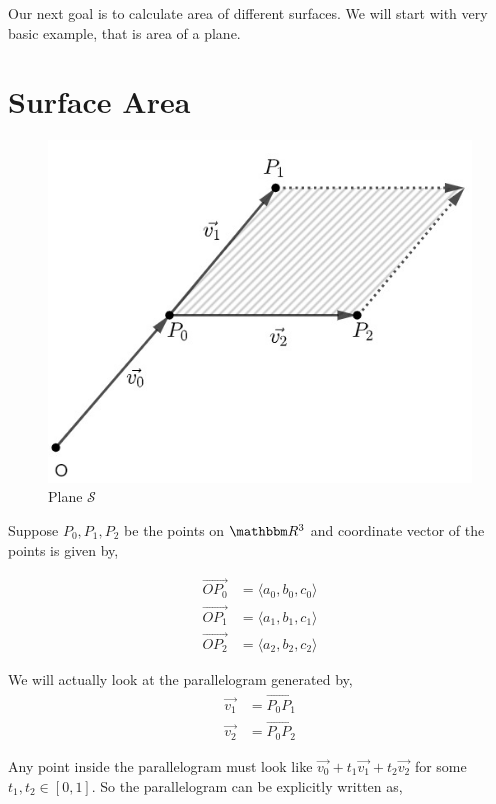 \documentclass[../Analysis-3]{subfiles}
\begin{document}
Our next goal is to calculate area of different surfaces. We will start with very basic example, that is area of a plane.

\vfill

\pagebreak

\section{Surface Area} \label{marker}

\begin{figure}
    \centering
    \includegraphics[width=.78\linewidth]{../figures/lec-25.1.png}
    \caption{Plane $\mathcal{S}$}
\end{figure}

Suppose $P_0,P_1,P_2$ be the points on $\R^3$ and coordinate vector of the points is given by,

\begin{align*}
    \vec{OP_0} & = \langle a_0,b_0,c_0 \rangle \\
    \vec{OP_1} & = \langle a_1,b_1,c_1 \rangle \\
    \vec{OP_2} & = \langle a_2,b_2,c_2 \rangle
\end{align*}

We will actually look at the parallelogram generated by,
\begin{align*}
    \vec{v_1} & = \vec{P_0P_1} \\
    \vec{v_2} & = \vec{P_0P_2}
\end{align*}

Any point inside the parallelogram must look like $\vec{v_0} + t_1 \vec{v_1} +t_2 \vec{v_2}$ for some $t_1,t_2 \in [0,1]$. So the parallelogram can be explicitly written as,
\end{document}
